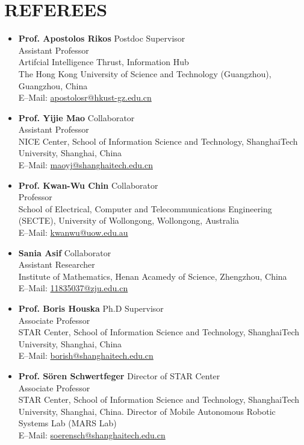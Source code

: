 \documentclass[paper=a4,fontsize=11pt]{scrartcl} %
\newcommand{\NewPart}[1]{\section*{\uppercase{#1}}}
\begin{document}
			
			
			\NewPart{Referees}
			
			\begin{itemize}
				\item \textbf{Prof. Apostolos Rikos} {\hfill Postdoc Supervisor}\\
				Assistant Professor\\ Artifcial Intelligence Thrust, Information Hub\\
				The Hong Kong University of Science and Technology (Guangzhou), Guangzhou, China\\
				E--Mail: \url{apostolosr@hkust-gz.edu.cn}
				
				\item \textbf{Prof. Yijie Mao} {\hfill Collaborator}\\
				Assistant Professor\\ NICE Center, School of Information Science and
				Technology, ShanghaiTech University, Shanghai, China\\
				E--Mail: \url{maoyj@shanghaitech.edu.cn}
				
				\item \textbf{Prof. Kwan-Wu Chin} {\hfill Collaborator}\\
				Professor\\  School of Electrical, Computer and Telecommunications Engineering (SECTE), University of Wollongong, Wollongong, Australia \\
				E--Mail: \url{kwanwu@uow.edu.au}
				
				
				
				
				
				\item \textbf{Sania Asif} {\hfill Collaborator}\\
				Assistant Researcher \\Institute of Mathematics, Henan Acamedy of Science, Zhengzhou, China \\
				E--Mail: \url{11835037@zju.edu.cn}
				
				
				
				
				\item \textbf{Prof. Boris Houska} {\hfill Ph.D Supervisor}\\
				Associate Professor\\ STAR Center, School of Information Science and
				Technology, ShanghaiTech University, Shanghai, China\\
				E--Mail: \url{borish@shanghaitech.edu.cn}
				
				\item \textbf{Prof. S\"oren Schwertfeger} {\hfill Director of STAR Center}\\
				Associate Professor\\ STAR Center, School of Information Science and
				Technology, ShanghaiTech University, Shanghai, China. Director of Mobile Autonomous Robotic Systems Lab (MARS Lab)\\
				E--Mail: \url{soerensch@shanghaitech.edu.cn}
			\end{itemize}
			\vspace{5cm}
		
\end{document}
